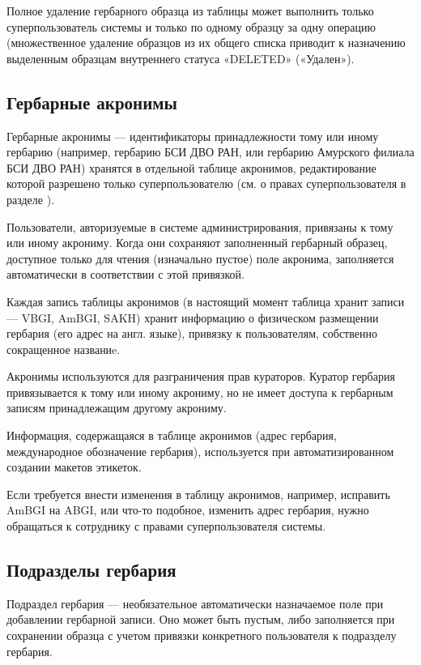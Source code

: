 \documentclass[letterpaper,10pt,russian]{sphinxmanual}
\begin{document}
Полное удаление гербарного образца из таблицы может выполнить только суперпользователь системы и только по
одному образцу за одну операцию (множественное удаление образцов из их общего списка приводит
к назначению выделенным образцам внутреннего статуса «DELETED» («Удален»).

\ignorespaces 

\subsection{Гербарные акронимы}
\label{\detokenize{main:id6}}\label{\detokenize{main:index-2}}
Гербарные акронимы — идентификаторы принадлежности тому или иному гербарию
(например, гербарию БСИ ДВО РАН, или гербарию Амурского филиала БСИ ДВО РАН)
хранятся в отдельной таблице акронимов,
редактирование которой разрешено только суперпользователю
(см. о правах суперпользователя в разделе {\hyperref[\detokenize{main:id8}]{}}).

Пользователи, авторизуемые в системе администрирования, привязаны к тому или иному акрониму.
Когда они сохраняют заполненный гербарный образец,
доступное только для чтения (изначально пустое) поле акронима,
заполняется автоматически в соответствии с этой привязкой.

Каждая запись таблицы акронимов (в настоящий момент таблица хранит записи — VBGI, AmBGI, SAKH)
хранит информацию о физическом размещении гербария (его адрес на англ. языке),
привязку к пользователям, собственно сокращенное названиe.

Акронимы используются для разграничения прав кураторов.
Куратор гербария привязывается к тому или иному акрониму, но не имеет
доступа к гербарным записям принадлежащим другому акрониму.

Информация, содержащаяся в таблице акронимов
(адрес гербария, международное обозначение гербария),
используется при автоматизированном создании макетов этикеток.

Если требуется внести изменения в таблицу акронимов, например,
исправить AmBGI на ABGI, или что-то подобное, изменить адрес гербария,
нужно обращаться к сотруднику с правами суперпользователя системы.

\ignorespaces 

\subsection{Подразделы гербария}
\label{\detokenize{main:index-3}}\label{\detokenize{main:id7}}
Подраздел гербария — необязательное автоматически назначаемое поле
при добавлении гербарной записи.
Оно может быть пустым, либо заполняется при сохранении образца с учетом привязки
конкретного пользователя к подразделу гербария.
\end{document}
